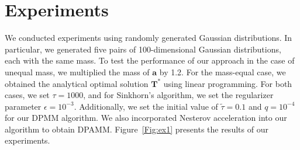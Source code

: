 \documentclass[conference]{IEEEtran}
\newcommand{\mat}[1]{\mathbf{#1}}
\renewcommand{\vec}[1]{\bm{#1}}
\begin{document}
\section{Experiments}

We conducted experiments using randomly generated Gaussian distributions. In particular, we generated five pairs of 100-dimensional Gaussian distributions, each with the same mass. To test the performance of our approach in the case of unequal mass, we multiplied the mass of $\vec a$ by 1.2. For the mass-equal case, we obtained the analytical optimal solution $\mat T^{*}$ using linear programming. For both cases, we set $\tau = 1000$, and for Sinkhorn's algorithm, we set the regularizer parameter $\epsilon = 10^{-3}$. Additionally, we set the initial value of $\tilde{\tau} = 0.1$ and $q = 10^{-4}$ for our DPMM algorithm. We also incorporated Nesterov acceleration into our algorithm to obtain DPAMM. Figure~\ref{Fig:ex1} presents the results of our experiments.
\end{document}
